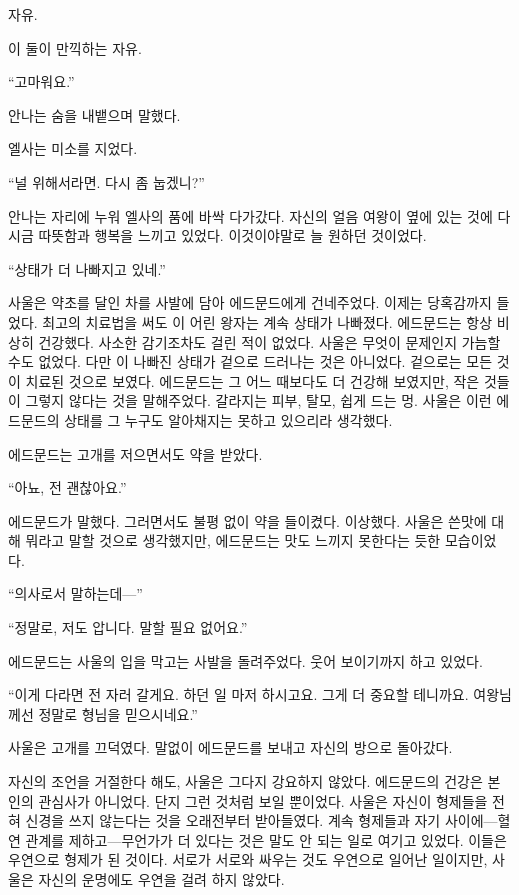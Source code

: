 자유.

이 둘이 만끽하는 자유.

``고마워요.''

안나는 숨을 내뱉으며 말했다.

엘사는 미소를 지었다.

``널 위해서라면. 다시 좀 눕겠니?''

안나는 자리에 누워 엘사의 품에 바싹 다가갔다. 자신의 얼음 여왕이 옆에 있는 것에 다시금 따뜻함과 행복을 느끼고 있었다. 이것이야말로 늘 원하던 것이었다.

\textbreak

\forceindent``상태가 더 나빠지고 있네.''

사울은 약초를 달인 차를 사발에 담아 에드문드에게 건네주었다. 이제는 당혹감까지 들었다. 최고의 치료법을 써도 이 어린 왕자는 계속 상태가 나빠졌다. 에드문드는 항상 비상히 건강했다. 사소한 감기조차도 걸린 적이 없었다. 사울은 무엇이 문제인지 가늠할 수도 없었다. 다만 이 나빠진 상태가 겉으로 드러나는 것은 아니었다. 겉으로는 모든 것이 치료된 것으로 보였다. 에드문드는 그 어느 때보다도 더 건강해 보였지만, 작은 것들이 그렇지 않다는 것을 말해주었다. 갈라지는 피부, 탈모, 쉽게 드는 멍. 사울은 이런 에드문드의 상태를 그 누구도 알아채지는 못하고 있으리라 생각했다.

에드문드는 고개를 저으면서도 약을 받았다.

``아뇨, 전 괜찮아요.''

에드문드가 말했다. 그러면서도 불평 없이 약을 들이켰다. 이상했다. 사울은 쓴맛에 대해 뭐라고 말할 것으로 생각했지만, 에드문드는 맛도 느끼지 못한다는 듯한 모습이었다.

``의사로서 말하는데—''

``정말로, 저도 압니다. 말할 필요 없어요.''

에드문드는 사울의 입을 막고는 사발을 돌려주었다. 웃어 보이기까지 하고 있었다.

``이게 다라면 전 자러 갈게요. 하던 일 마저 하시고요. 그게 더 중요할 테니까요. 여왕님께선 정말로 형님을 믿으시네요.''

사울은 고개를 끄덕였다. 말없이 에드문드를 보내고 자신의 방으로 돌아갔다.

자신의 조언을 거절한다 해도, 사울은 그다지 강요하지 않았다. 에드문드의 건강은 본인의 관심사가 아니었다. 단지 그런 것처럼 보일 뿐이었다. 사울은 자신이 형제들을 전혀 신경을 쓰지 않는다는 것을 오래전부터 받아들였다. 계속 형제들과 자기 사이에—혈연 관계를 제하고—무언가가 더 있다는 것은 말도 안 되는 일로 여기고 있었다. 이들은 우연으로 형제가 된 것이다. 서로가 서로와 싸우는 것도 우연으로 일어난 일이지만, 사울은 자신의 운명에도 우연을 걸려 하지 않았다.

